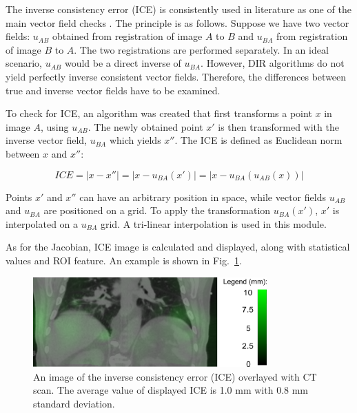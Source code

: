 The inverse consistency error (ICE) is consistently used in literature as one of the main vector field checks \cite{Christensen2001, Bender2009}. The principle is as follows. 
Suppose we have two vector fields: $u_{AB}$ obtained from registration of image $A$ to $B$ and $u_{BA}$ from registration of image $B$ to $A$. The two registrations
are performed separately. In an ideal scenario, $u_{AB}$ would be a direct inverse of $u_{BA}$. However, DIR algorithms do not yield perfectly inverse consistent vector fields. Therefore, the differences between true and inverse vector fields have to be examined.


To check for ICE, an algorithm was created that first transforms a point $x$ in image $A$, using $u_{AB}$. The newly obtained point $x'$ is then transformed with the inverse vector
field, $u_{BA}$ which yields $x''$. The ICE is defined as Euclidean norm between $x$ and $x''$:

\begin{equation}
\label{eq:ice}
ICE = |x - x''| = |x - u_{BA}(x')| = |x - u_{BA}(u_{AB}(x))|
\end{equation}

Points $x'$ and $x''$ can have an arbitrary position in space, while vector fields $u_{AB}$ and $u_{BA}$ are positioned on a grid. To apply the transformation $u_{BA}(x')$, $x'$ is interpolated on a $u_{BA}$ grid. A tri-linear interpolation is used in this module.

As for the Jacobian, ICE image is calculated and displayed, along with statistical values and ROI feature. An example is shown in Fig.~\ref{inv}.




\begin{figure}[H]
\begin{center}
\includegraphics[width=0.8\textwidth]{./Vmm/Images/inv.png}
\caption{An image of the inverse consistency error (ICE) overlayed with CT scan. The average value of displayed ICE is 1.0 mm with 0.8 mm standard deviation.}
\label{inv}
\end{center}
\end{figure}


